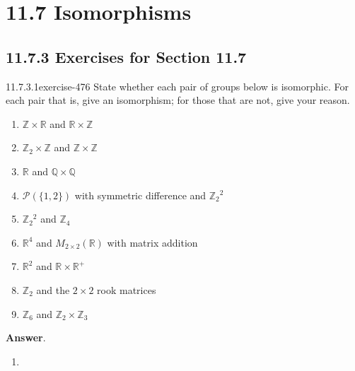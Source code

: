 \documentclass[twoside,10pt,]{book}
\numberwithin{equation}{section}
\begin{document}
\section*{11.7 Isomorphisms}
\subsection*{11.7.3 Exercises for Section 11.7}
\begin{divisionsolution}{11.7.3.1}{}{exercise-476}%
\hypertarget{p-4259}{}%
State whether each pair of groups below is isomorphic. For each pair that is, give an isomorphism; for those that are not, give your reason.\leavevmode%
\begin{enumerate}[label=(\alph*)]
\item\hypertarget{li-1944}{}\hypertarget{p-4260}{}%
\(\mathbb{Z} \times  \mathbb{R}\) and \(\mathbb{R} \times  \mathbb{Z}\)%
\item\hypertarget{li-1945}{}\hypertarget{p-4261}{}%
\(\mathbb{Z}_2\times \mathbb{Z}\)  and \(\mathbb{Z} \times  \mathbb{Z}\)%
\item\hypertarget{li-1946}{}\hypertarget{p-4262}{}%
\(\mathbb{R}\) and \(\mathbb{Q} \times  \mathbb{Q}\)%
\item\hypertarget{li-1947}{}\hypertarget{p-4263}{}%
\(\mathcal{P}(\{1, 2\})\) with symmetric difference and \(\mathbb{Z}_2{}^2\)%
\item\hypertarget{li-1948}{}\hypertarget{p-4264}{}%
\(\mathbb{Z}_2{}^2\) and \(\mathbb{Z}_4\)%
\item\hypertarget{li-1949}{}\hypertarget{p-4265}{}%
\(\mathbb{R}^4\) and \(M_{2\times 2}(\mathbb{R})\) with matrix addition%
\item\hypertarget{li-1950}{}\hypertarget{p-4266}{}%
\(\mathbb{R}^2\) and \(\mathbb{R} \times  \mathbb{R}^+\)%
\item\hypertarget{li-1951}{}\hypertarget{p-4267}{}%
\(\mathbb{Z}_2\) and the \(2 \times  2\) rook matrices%
\item\hypertarget{li-1952}{}\hypertarget{p-4268}{}%
\(\mathbb{Z}_6\) and \(\mathbb{Z}_2\times  \mathbb{Z}_3\)%
\end{enumerate}
%
\par\smallskip%
\noindent\textbf{Answer}.\quad%
\hypertarget{p-4269}{}%
\leavevmode%
\begin{enumerate}[label=(\alph*)]
\item\hypertarget{li-1953}{}\hypertarget{p-4270}{}%

\end{enumerate}
\end{divisionsolution}
\end{document}
